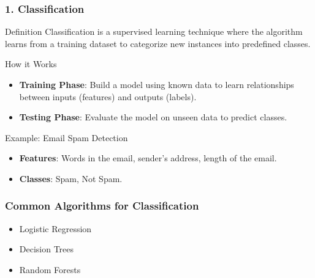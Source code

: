 \documentclass[aspectratio=169]{beamer}
\begin{document}
\begin{frame}[fragile]
    \frametitle{1. Classification}
    \begin{block}{Definition}
        Classification is a supervised learning technique where the algorithm learns from a training dataset to categorize new instances into predefined classes.
    \end{block}

    \begin{block}{How it Works}
        \begin{itemize}
            \item \textbf{Training Phase}: Build a model using known data to learn relationships between inputs (features) and outputs (labels).
            \item \textbf{Testing Phase}: Evaluate the model on unseen data to predict classes.
        \end{itemize}
    \end{block}

    \begin{block}{Example: Email Spam Detection}
        \begin{itemize}
            \item \textbf{Features}: Words in the email, sender's address, length of the email.
            \item \textbf{Classes}: Spam, Not Spam.
        \end{itemize}
    \end{block}
\end{frame}

\begin{frame}[fragile]
    \frametitle{Common Algorithms for Classification}
    \begin{itemize}
        \item Logistic Regression
        \item Decision Trees
        \item Random Forests
    \end{itemize}
\end{frame}
\end{document}
